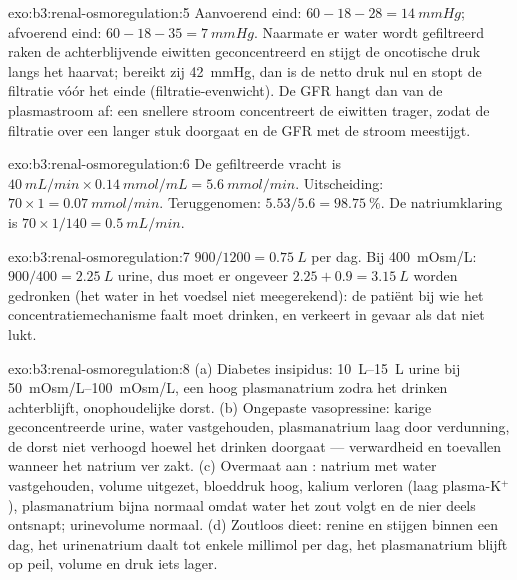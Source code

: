 \begin{solution}{exo:b3:renal-osmoregulation:5}
Aanvoerend eind: $60 - 18 - 28 = \qty{14}{mmHg}$; afvoerend eind: $60 - 18 -
35 = \qty{7}{mmHg}$. Naarmate er water wordt gefiltreerd raken de
achterblijvende eiwitten geconcentreerd en stijgt de oncotische druk
langs het haarvat; bereikt zij \qty{42}{mmHg}, dan is de netto druk nul
en stopt de filtratie vóór het einde (filtratie-evenwicht). De GFR
hangt dan van de plasmastroom af: een snellere stroom concentreert de
eiwitten trager, zodat de filtratie over een langer stuk doorgaat en de
GFR met de stroom meestijgt.
\end{solution}

\begin{solution}{exo:b3:renal-osmoregulation:6}
De gefiltreerde vracht is $\qty{40}{mL/min}\times\qty{0.14}{mmol/mL} =
\qty{5.6}{mmol/min}$. Uitscheiding: $70\times 1 = \qty{0.07}{mmol/min}$.
Teruggenomen: $5.53/5.6 = \qty{98.75}{\%}$. De natriumklaring is
$70\times 1/140 = \qty{0.5}{mL/min}$.
\end{solution}

\begin{solution}{exo:b3:renal-osmoregulation:7}
$900/1200 = \qty{0.75}{L}$ per dag. Bij \qty{400}{mOsm/L}: $900/400 =
\qty{2.25}{L}$ urine, dus moet er ongeveer $2.25 + 0.9 = \qty{3.15}{L}$
worden gedronken (het water in het voedsel niet meegerekend): de
patiënt bij wie het concentratiemechanisme faalt moet drinken, en
verkeert in gevaar als dat niet lukt.
\end{solution}

\begin{solution}{exo:b3:renal-osmoregulation:8}
(a) Diabetes insipidus: \qtyrange{10}{15}{L} urine bij
\qtyrange{50}{100}{mOsm/L}, een hoog plasmanatrium zodra het drinken
achterblijft, onophoudelijke dorst. (b) Ongepaste vasopressine: karige
geconcentreerde urine, water vastgehouden, plasmanatrium laag door
verdunning, de dorst niet verhoogd hoewel het drinken doorgaat ---
verwardheid en toevallen wanneer het natrium ver zakt. (c) Overmaat aan
: natrium met water vastgehouden, volume uitgezet, bloeddruk
hoog, kalium verloren (laag plasma-K$^{+}$), plasmanatrium bijna
normaal omdat water het zout volgt en de nier deels ontsnapt;
urinevolume normaal. (d) Zoutloos dieet: renine en  stijgen
binnen een dag, het urinenatrium daalt tot enkele millimol per dag, het
plasmanatrium blijft op peil, volume en druk iets lager.
\end{solution}

